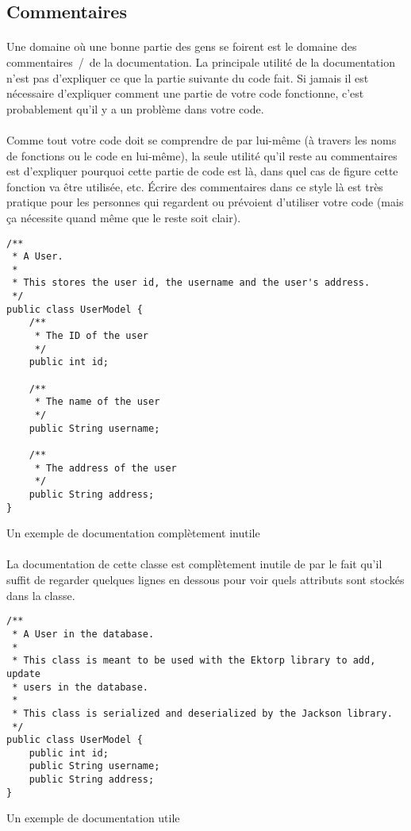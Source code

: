\subsection{Commentaires}

\paragraph{} Une domaine où une bonne partie des gens se foirent est le domaine
des commentaires~/~de la documentation. La principale utilité de la
documentation n'est pas d'expliquer ce que la partie suivante du code fait. Si
jamais il est nécessaire d'expliquer comment une partie de votre code
fonctionne, c'est probablement qu'il y a un problème dans votre code.

\paragraph{} Comme tout votre code doit se comprendre de par lui-même (à
travers les noms de fonctions ou le code en lui-même), la seule utilité qu'il
reste au commentaires est d'expliquer pourquoi cette partie de code est là,
dans quel cas de figure cette fonction va être utilisée, etc. Écrire des
commentaires dans ce style là est très pratique pour les personnes qui
regardent ou prévoient d'utiliser votre code (mais ça nécessite quand même que
le reste soit clair).

\begin{listing}[H]
	\centering
	\begin{verbatim}
/**
 * A User.
 *
 * This stores the user id, the username and the user's address.
 */
public class UserModel {
	/**
	 * The ID of the user
	 */
	public int id;

	/**
	 * The name of the user
	 */
	public String username;

	/**
	 * The address of the user
	 */
	public String address;
}
	\end{verbatim}
	\caption{Un exemple de documentation complètement inutile}
\end{listing}

\paragraph{} La documentation de cette classe est complètement inutile de par
le fait qu'il suffit de regarder quelques lignes en dessous pour voir quels
attributs sont stockés dans la classe.

\begin{listing}[H]
	\centering
	\begin{verbatim}
/**
 * A User in the database.
 *
 * This class is meant to be used with the Ektorp library to add, update
 * users in the database.
 *
 * This class is serialized and deserialized by the Jackson library.
 */
public class UserModel {
	public int id;
	public String username;
	public String address;
}
	\end{verbatim}
	\caption{Un exemple de documentation utile}
\end{listing}
